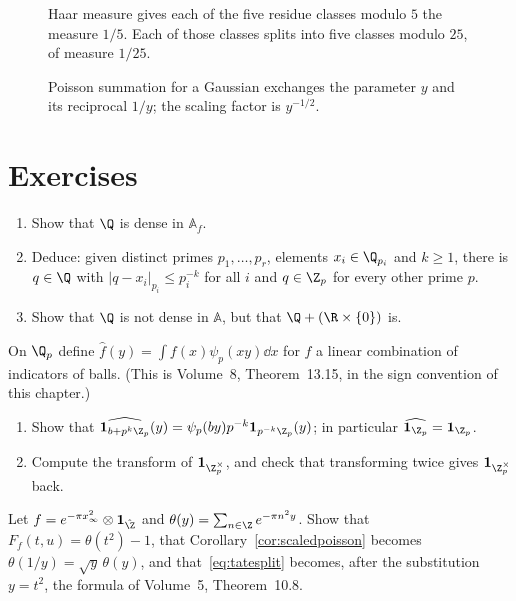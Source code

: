 \begin{figure}[ht]
\centering
{}
\caption{Haar measure gives each of the five residue classes modulo $5$ the measure $1/5$. Each of those classes splits into five classes modulo $25$, of measure $1/25$.}
\label{fig:v13-extra-12-a}
\end{figure}

\begin{figure}[ht]
\centering
{}
\caption{Poisson summation for a Gaussian exchanges the parameter $y$ and its reciprocal $1/y$; the scaling factor is $y^{-1/2}$.}
\label{fig:v13-extra-12-b}
\end{figure}

\section{Exercises}

\begin{exercise}[$\star$]\label{ex:strongapprox}
\begin{enumerate}[label=(\alph*)]
\item Show that $\Q$ is dense in $\mathbb{A}_f$.
\item Deduce: given distinct primes $p_1,\dots,p_r$, elements $x_i\in\Q_{p_i}$ and $k\ge1$, there is $q\in\Q$ with $|q-x_i|_{p_i}\le p_i^{-k}$ for all $i$ and
$q\in\Z_p$ for every other prime $p$.
\item Show that $\Q$ is not dense in $\mathbb{A}$, but that $\Q+(\R\times\{0\})$ is.
\end{enumerate}
\end{exercise}

\begin{exercise}[$\star$]\label{ex:ftzp}
On $\Q_p$ define $\hat f(y)=\int f(x)\psi_p(xy)\dd x$ for $f$ a linear combination of indicators of balls. (This is Volume~8,
Theorem~13.15, in the sign convention of this chapter.)
\begin{enumerate}[label=(\alph*)]
\item Show that $\widehat{\mathbf 1_{b+p^k\Z_p}}(y)=\psi_p(by)p^{-k}\mathbf 1_{p^{-k}\Z_p}(y)$; in particular $\widehat{\mathbf 1_{\Z_p}}=\mathbf 1_{\Z_p}$.
\item Compute the transform of $\mathbf 1_{\Z_p^\times}$, and check that transforming twice gives $\mathbf 1_{\Z_p^\times}$ back.
\end{enumerate}
\end{exercise}

\begin{exercise}[$\star$]\label{ex:theta}
Let $f=e^{-\pi x_\infty^2}\otimes\mathbf 1_{\hat{\Z}}$ and $\theta(y)=\sum_{n\in\Z}e^{-\pi n^2y}$. Show that $F_f(t,u)=\theta(t^2)-1$, that
Corollary~\ref{cor:scaledpoisson} becomes $\theta(1/y)=\sqrt y\,\theta(y)$, and that~\eqref{eq:tatesplit} becomes, after the substitution $y=t^2$, the
formula of Volume~5, Theorem~10.8.
\end{exercise}

